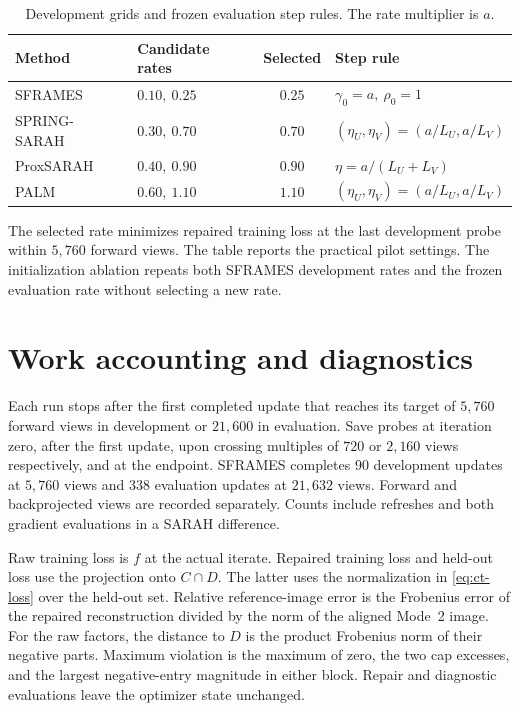 \documentclass[11pt]{article}
\begin{document}
\begin{table}[htbp]
  \centering
  \caption{Development grids and frozen evaluation step rules. The rate multiplier is \(a\).}
  \label{tab:ct-rates}
  \begin{tabular}{@{}llcl@{}}
    \toprule
    Method & Candidate rates & Selected & Step rule \\
    \midrule
    SFRAMES      & \(0.10,\ 0.25\) & \(0.25\) & \(\gamma_0=a,\ \rho_0=1\) \\
    SPRING-SARAH & \(0.30,\ 0.70\) & \(0.70\) & \((\eta_U,\eta_V)=(a/L_U,a/L_V)\) \\
    ProxSARAH    & \(0.40,\ 0.90\) & \(0.90\) & \(\eta=a/(L_U+L_V)\) \\
    PALM         & \(0.60,\ 1.10\) & \(1.10\) & \((\eta_U,\eta_V)=(a/L_U,a/L_V)\) \\
    \bottomrule
  \end{tabular}
\end{table}

The selected rate minimizes repaired training loss at the last development probe within \(5{,}760\) forward views. The table reports the practical pilot settings. The initialization ablation repeats both SFRAMES development rates and the frozen evaluation rate without selecting a new rate.

\section{Work accounting and diagnostics}
\label{sec:ct-work}

Each run stops after the first completed update that reaches its target of \(5{,}760\) forward views in development or \(21{,}600\) in evaluation. Save probes at iteration zero, after the first update, upon crossing multiples of \(720\) or \(2{,}160\) views respectively, and at the endpoint. SFRAMES completes 90 development updates at \(5{,}760\) views and 338 evaluation updates at \(21{,}632\) views. Forward and backprojected views are recorded separately. Counts include refreshes and both gradient evaluations in a SARAH difference.

Raw training loss is \(f\) at the actual iterate. Repaired training loss and held-out loss use the projection onto \(C\cap D\). The latter uses the normalization in \eqref{eq:ct-loss} over the held-out set. Relative reference-image error is the Frobenius error of the repaired reconstruction divided by the norm of the aligned Mode~2 image. For the raw factors, the distance to \(D\) is the product Frobenius norm of their negative parts. Maximum violation is the maximum of zero, the two cap excesses, and the largest negative-entry magnitude in either block. Repair and diagnostic evaluations leave the optimizer state unchanged.
\end{document}
